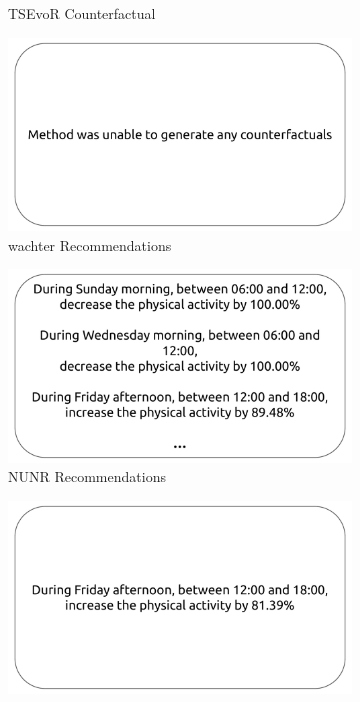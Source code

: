 \begin{figure}[h!]
\begin{subfigure}[b]{0.24\textwidth}
         \caption{TSEvoR Counterfactual}
         \label{fig:cf:tsevo}
     \end{subfigure}

          \begin{subfigure}[b]{0.24\textwidth}
         \centering
         \includegraphics[width=\textwidth]{images/6306/0_6306_TCN_Wachter_reco.pdf}
         \caption{\gls{wachter} Recommendations}
         \label{fig:reco:wachter}
     \end{subfigure}
     \hfill
     \begin{subfigure}[b]{0.24\textwidth}
         \centering
         \includegraphics[width=\textwidth]{images/6306/4_6306_TCN_NUN_reco.pdf}
         \caption{NUNR Recommendations}
         \label{fig:reco:nun}
     \end{subfigure}
     \hfill
     \begin{subfigure}[b]{0.24\textwidth}
         \centering
         \includegraphics[width=\textwidth]{images/6306/1_6306_TCN_DBA_reco.pdf}

\end{subfigure}
\end{figure}
